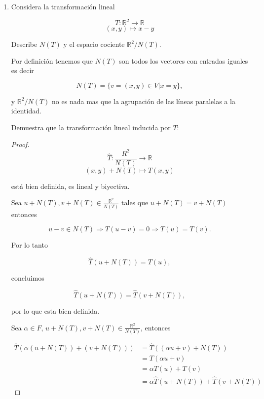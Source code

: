 \documentclass[letterpaper]{article}
\theoremstyle{definition}
\theoremstyle{lemathm}
\theoremstyle{lemademthm}
\newcommand{\R}{\mathbb{R}}
\begin{document}
\begin{enumerate}
\begin{proof}
			cuya solucion es

			\begin{align*}
				c_1 = \frac{(a_1-x)(a_3-x)}{(a_2-a_1)(a_2-a_3)} && c_2 = \frac{(a_2-x)(a_3-x)}{(a_1-a_2)(a_1-a_3)} && c_3 = \frac{(a_1-x)(a_2-x)}{(a_3-a_1)(a_3 - a_2)}
			\end{align*}

			Podemos verificar facilmente que estos tres vectores son una base para $V$ y por el teorema $2.24$ concluimos que $\beta^*$ es una base de $V^*$.

		\end{proof}

		\item Considera la transformación lineal
		
		\[T: \R^2 \rightarrow \R\]
		\[(x,y) \mapsto x - y\]

		Describe $N(T)$ y el espacio cociente $\R^2/N(T)$.

		Por definición tenemos que $N(T)$ son todos los vectores con entradas iguales es decir

		\[N(T) = \{v = (x,y) \in V| x = y\},\]

		y $\R^2/N(T)$ no es nada mas que la agrupación de las líneas paralelas a la identidad.

		Demuestra que la transformación lineal inducida por $T$:

		\begin{proof}
			\[\hat{T} : \frac{R^2}{N(T)} \rightarrow \R\]
			\[(x,y) + N(T) \mapsto T(x,y)\]

			está bien definida, es lineal y biyectiva.

			Sea $u + N(T), v + N(T) \in \frac{\R^2}{N(T)}$ tales que $u + N(T) = v + N(T)$ entonces

			\[u - v \in N(T) \Rightarrow T(u - v) = 0 \Rightarrow T(u) = T(v).\]

			Por lo tanto

			\[\hat{T}(u + N(T)) = T(u),\]

			concluimos

			\[\hat{T}(u + N(T)) = \hat{T}(v + N(T)),\]

			por lo que esta bien definida.

			Sea $\alpha \in F$, $u + N(T), v + N(T) \in \frac{\R^2}{N(T)}$, entonces

			\begin{align*}
				\hat{T}(\alpha(u + N(T)) + (v + N(T))) &= \hat{T}((\alpha u + v) + N(T))\\
				&= T(\alpha u + v)\\
				&= \alpha T(u) + T(v)\\
				&= \alpha\hat{T}(u+N(T)) + \hat{T}(v + N(T))
			\end{align*}


\end{proof}
\end{enumerate}
\end{document}
